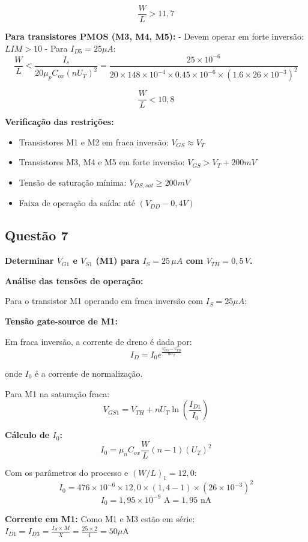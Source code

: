 \documentclass[12pt,a4paper]{article}
\begin{document}
$$\frac{W}{L} > 11,7$$

\t\textbf{Para transistores PMOS (M3, M4, M5):}
- Devem operar em forte inversão: $LIM > 10$
- Para $I_{D5} = 25\mu A$:
$$\frac{W}{L} < \frac{I_s}{20\mu_p C_{ox} (nU_T)^2} = \frac{25 \times 10^{-6}}{20 \times 148 \times 10^{-4} \times 0.45 \times 10^{-6} \times (1.6 \times 26 \times 10^{-3})^2}$$

$$\frac{W}{L} < 10,8$$

\t\textbf{Verificação das restrições:}
\begin{itemize}
    \item Transistores M1 e M2 em fraca inversão: $V_{GS} \approx V_T$
    \item Transistores M3, M4 e M5 em forte inversão: $V_{GS} > V_T + 200mV$
    \item Tensão de saturação mínima: $V_{DS,sat} \geq 200mV$
    \item Faixa de operação da saída: até $(V_{DD} - 0,4V)$
\end{itemize}

\subsection*{Questão 7}
	\textbf{Determinar $V_{G1}$ e $V_{S1}$ (M1) para $I_S = 25\,\mu A$ com $V_{TH} = 0{,}5\,V$.}

\t\textbf{Análise das tensões de operação:}

Para o transistor M1 operando em fraca inversão com $I_S = 25 \mu A$:

\t\textbf{Tensão gate-source de M1:}

Em fraca inversão, a corrente de dreno é dada por:
$$I_D = I_0 e^{\frac{V_{GS} - V_{TH}}{nU_T}} $$

onde $I_0$ é a corrente de normalização.

Para M1 na saturação fraca:
$$V_{GS1} = V_{TH} + nU_T \ln\left(\frac{I_{D1}}{I_0}\right) $$

\t\textbf{Cálculo de $I_0$:}
$$I_0 = \mu_n C_{ox} \frac{W}{L} (n-1)(U_T)^2 $$

Com os parâmetros do processo e $(W/L)_1 = 12,0$:
$$I_0 = 476 \times 10^{-6} \times 12,0 \times (1,4-1) \times (26 \times 10^{-3})^2$$
$$I_0 = 1,95 \times 10^{-9} \text{ A} = 1,95 \text{ nA}$$

\t\textbf{Corrente em M1:}
Como M1 e M3 estão em série: $I_{D1} = I_{D3} = \frac{I_S \times M}{X} = \frac{25 \times 2}{1} = 50 \mu\text{A}$
\end{document}
